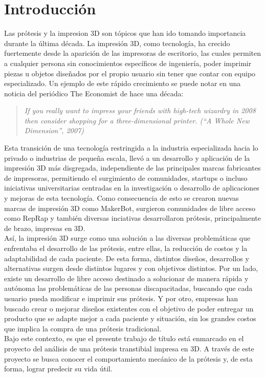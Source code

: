 \chapter{Introducción}

Las prótesis y la impresion 3D son tópicos que han ido tomando importancia durante la última década. La impresión 3D, como tecnología, ha crecido fuertemente desde la aparición de las impresoras de escritorio, las cuales permiten a cualquier persona sin conocimientos específicos de ingeniería, poder imprimir piezas u objetos diseñados por el propio usuario sin tener que contar con equipo especializado. Un ejemplo de este rápido crecimiento se puede notar en una noticia del periódico The Economist de hace una década: 

\begin{quote}
\textit{If you really want to impress your friends with high-tech wizardry in 2008 then consider shopping for a three-dimensional printer. (``A Whole New Dimension'', 2007)}
\end{quote}


Esta transición de una tecnología restringida a la industria especializada hacia lo privado o industrias de pequeña escala, llevó a un desarrollo y aplicación de la impresión 3D más disgregada, independiente de las principales marcas fabricantes de impresoras, permitiendo el surgimiento de comunidades, startups o incluso iniciativas universitarias centradas en la investigación o desarrollo de aplicaciones y mejoras de esta tecnología. Como consecuencia de esto se crearon nuevas marcas de impresión 3D como MakerBot, surgieron comunidades de libre acceso como RepRap y también diversas inciativas desarrollaron prótesis, principalmente de brazo, impresas en 3D.\\

Así, la impresión 3D surge como una solución a las diversas problemáticas que enfrentaba el desarrollo de las prótesis, entre ellas, la reducción de costos y la adaptabilidad de cada paciente. De esta forma, distintos diseños, desarrollos y alternativas surgen desde distintos lugares y con objetivos distintos. Por un lado, existe un desarrollo de libre acceso destinado a solucionar de manera rápida y autónoma las problemáticas de las personas discapacitadas, buscando que cada usuario pueda modificar e imprimir sus prótesis. Y por otro, empresas han buscado crear o mejorar diseños existentes con el objetivo de poder entregar un producto que se adapte mejor a cada paciente y situación, sin los grandes costos que implica la compra de una prótesis tradicional.\\

Bajo este contexto, es que el presente trabajo de título está enmarcado en el proyecto del análisis de una prótesis transtibial impresa en 3D. A través de este proyecto se busca conocer el comportamiento mecánico de la prótesis y, de esta forma, lograr predecir su vida útil.


